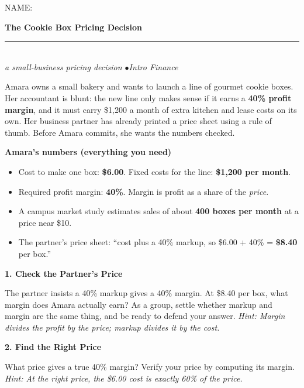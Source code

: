 \documentclass[11pt]{article}
\newcommand{\question}[1]{\medskip\noindent\textbf{#1}\par\smallskip}
\newcommand{\hint}[1]{{\small\color{gray}\textit{Hint: #1}}\par}
\begin{document}
\thispagestyle{fancy}
{\small NAME: \underline{\hspace{2.6in}}}\par\vspace{4pt}
\begin{center}
{\LARGE\bfseries The Cookie Box Pricing Decision}\\[3pt]
\rule{2.2in}{0.8pt}\\[4pt]
{\itshape a small-business pricing decision \quad$\bullet$\quad Intro Finance}
\end{center}

\vspace{2pt}

Amara owns a small bakery and wants to launch a line of gourmet cookie boxes. Her accountant is blunt: the new line only makes sense if it earns a \textbf{40\% profit margin}, and it must carry \$1{,}200 a month of extra kitchen and lease costs on its own. Her business partner has already printed a price sheet using a rule of thumb. Before Amara commits, she wants the numbers checked.

\smallskip
\begin{databox}
\textbf{Amara's numbers (everything you need)}
\begin{itemize}[leftmargin=14pt, itemsep=2pt, topsep=3pt]
\item Cost to make one box: \textbf{\$6.00}. Fixed costs for the line: \textbf{\$1{,}200 per month}.
\item Required profit margin: \textbf{40\%}. Margin is profit as a share of the \emph{price}.
\item A campus market study estimates sales of about \textbf{400 boxes per month} at a price near \$10.
\item The partner's price sheet: ``cost plus a 40\% markup, so \$6.00 + 40\% = \textbf{\$8.40} per box.''
\end{itemize}
\end{databox}

\question{1. Check the Partner's Price}
The partner insists a 40\% markup gives a 40\% margin. At \$8.40 per box, what margin does Amara actually earn? As a group, settle whether markup and margin are the same thing, and be ready to defend your answer.
\hint{Margin divides the profit by the price; markup divides it by the cost.}

\question{2. Find the Right Price}
What price gives a true 40\% margin? Verify your price by computing its margin.
\hint{At the right price, the \$6.00 cost is exactly 60\% of the price.}
\end{document}
